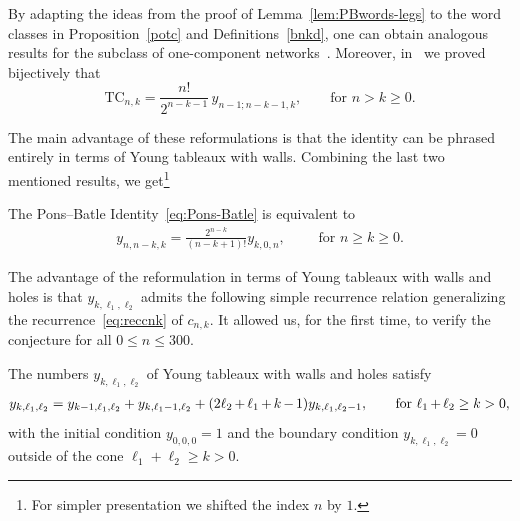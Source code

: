 \documentclass[a4paper,UKenglish,cleveref, autoref, thm-restate]{lipics-v2021}
\newcommand{\TC}{\mathrm{TC}}
\begin{document}
By adapting the ideas from the proof of Lemma~\ref{lem:PBwords-legs} to the word classes in Proposition~\ref{potc} and Definitions~\ref{bnkd}, one can obtain analogous results for the subclass of one-component networks~\cite{FuchsLiuYu2021Note}. Moreover, in~\cite[Theorem~3.4]{Changetal2023dcombining} we proved bijectively that
\[
\TC_{n,k} = \frac{n!}{2^{n-k-1}}\, y_{n-1;n-k-1,k}, \qquad \text{for } n>k\ge 0.
\]

The main advantage of these reformulations is that the identity can be phrased entirely in terms of Young tableaux with walls.
Combining the last two mentioned results, we get\footnote{For simpler presentation we shifted the index $n$ by $1$.}
\begin{proposition}
The Pons--Batle Identity~\eqref{eq:Pons-Batle} is equivalent to
\begin{align}
    \label{eq:ConjPB_YT}
    y_{n,n-k,k} = \frac{2^{n-k}}{(n-k+1)!} y_{k,0,n}, \qquad  \text{ for } n \geq k \geq 0.
\end{align}
\end{proposition}

The advantage of the reformulation in terms of Young tableaux with walls and holes is that $y_{k,\ell_1,\ell_2}$ admits the following simple recurrence relation generalizing the recurrence~\eqref{eq:reccnk} of $c_{n,k}$.
It allowed us, for the first time, to verify the conjecture for all $0 \le n \le 300$.

\begin{lemma}
    The numbers $y_{k, \ell_1, \ell_2}$ of Young tableaux with walls and holes satisfy
    {
    \newcommand{\nrwop}[1]{\hspace{-0.075em} #1 \hspace{-0.075em}}
    \begin{align}
        \label{eq:rec_ykl1l2}
        y_{k, \ell_1, \ell_2} = y_{k-1,\ell_1,\ell_2} + y_{k, \ell_1-1, \ell_2} + (2\ell_2 \nrwop{+} \ell_1 \nrwop{+} k \nrwop{-} 1) y_{k, \ell_1, \ell_2-1},
        \qquad \text{for } \ell_1 \nrwop{+} \ell_2 \geq k > 0,
    \end{align}
    }
    with the initial condition $y_{0,0,0} = 1$ and the boundary condition $y_{k,\ell_1,\ell_2} = 0$ outside of the cone $\ell_1 + \ell_2 \geq k > 0$.
\end{lemma}
\end{document}
